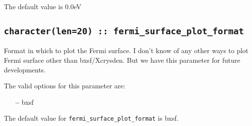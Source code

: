 The default value is 0.0eV


\subsection[fermi\_surface\_plot\_format]{\tt character(len=20) :: fermi\_surface\_plot\_format}

Format in which to plot the Fermi surface. I don't know of any other ways
to plot Fermi surface other than bxsf/Xcrysden. But we have this
parameter for future developments. 

The valid options for this parameter are:
\begin{itemize}
\item[{\bf --}] bxsf
\end{itemize}

The default value for \verb#fermi_surface_plot_format# is bxsf.


%




%
%
%
%
%
%
%
%
%
%
%
%




